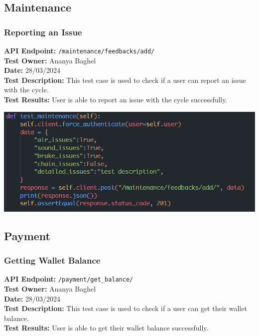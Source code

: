 \documentclass[11pt]{article}
\begin{document}
\subsection{Maintenance}
\subsubsection{Reporting an Issue}
\textbf{API Endpoint: } \texttt{/maintenance/feedbacks/add/} \\
\textbf{Test Owner: } Ananya Baghel \\
\textbf{Date: } 28/03/2024 \\
\textbf{Test Description: } This test case is used to check if a user can report an issue with the cycle. \\
\textbf{Test Results: } User is able to report an issue with the cycle successfully.\\

\begin{center}
    \includegraphics[scale=0.7]{unit_testing_codes/report_issue.png}
\end{center}

\subsection{Payment}
\subsubsection{Getting Wallet Balance}
\textbf{API Endpoint: } \texttt{/payment/get\_balance/} \\
\textbf{Test Owner: } Ananya Baghel \\
\textbf{Date: } 28/03/2024 \\
\textbf{Test Description: } This test case is used to check if a user can get their wallet balance. \\
\textbf{Test Results: } User is able to get their wallet balance successfully.\\
\end{document}
